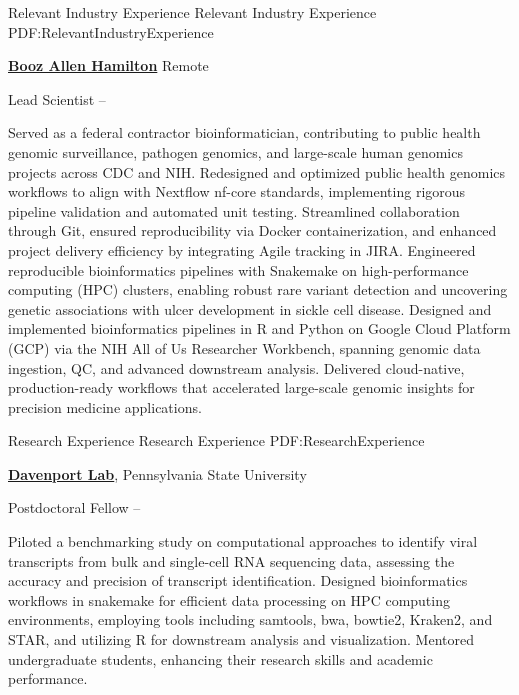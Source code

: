 \documentclass[letterpaper,MMMyyyy,nonstopmode]{simpleresumecv}
\begin{document}
\begin{Body}

\Section
{Relevant Industry\newline
Experience}
{Relevant Industry Experience}
{PDF:RelevantIndustryExperience}

\Entry
\href{https://www.boozallen.com/}
{\textbf{Booz Allen Hamilton}}
Remote

\Gap
\BulletItem
Lead Scientist
\hfill
{} --
\begin{Detail}
\SubBulletItem
Served as a federal contractor bioinformatician, contributing to public health genomic surveillance, pathogen genomics, and large-scale human genomics projects across CDC and NIH.
\SubBulletItem
Redesigned and optimized public health genomics workflows to align with Nextflow nf-core standards, implementing rigorous pipeline validation and automated unit testing. Streamlined collaboration through Git, ensured reproducibility via Docker containerization, and enhanced project delivery efficiency by integrating Agile tracking in JIRA.
\SubBulletItem
Engineered reproducible bioinformatics pipelines with Snakemake on high-performance computing \text(HPC\text) clusters, enabling robust rare variant detection and uncovering genetic associations with ulcer development in sickle cell disease.
\SubBulletItem
Designed and implemented bioinformatics pipelines in R and Python on Google Cloud Platform (GCP) via the NIH All of Us Researcher Workbench, spanning genomic data ingestion, QC, and advanced downstream analysis. Delivered cloud-native, production-ready workflows that accelerated large-scale genomic insights for precision medicine applications.
\end{Detail}


\Section
{Research Experience}
{Research Experience}
{PDF:ResearchExperience}

\Entry
\href{http://www.example.com/my-institute}
{\textbf{Davenport Lab}},
Pennsylvania State University

\Gap
\BulletItem
Postdoctoral Fellow
\hfill
{} --
\begin{Detail}
\SubBulletItem
Piloted a benchmarking study on computational approaches to identify viral transcripts from bulk and single-cell RNA sequencing data, assessing the accuracy and precision of transcript identification.
\SubBulletItem
Designed bioinformatics workflows in snakemake for efficient data processing on HPC computing environments, employing tools including samtools, bwa, bowtie2, Kraken2, and STAR, and utilizing R for downstream analysis and visualization.
\SubBulletItem
Mentored undergraduate students, enhancing their research skills and academic performance.
\end{Detail}


\end{Body}
\end{document}
